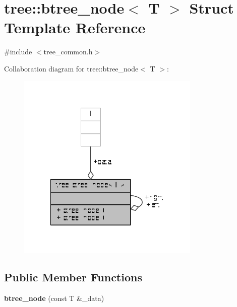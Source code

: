 \hypertarget{structtree_1_1btree__node}{\section{tree\-:\-:btree\-\_\-node$<$ T $>$ Struct Template Reference}
\label{structtree_1_1btree__node}
}


{\ttfamily \#include $<$tree\-\_\-common.\-h$>$}



Collaboration diagram for tree\-:\-:btree\-\_\-node$<$ T $>$\-:
\nopagebreak
\begin{figure}[H]
\begin{center}
\leavevmode
\includegraphics[width=247pt]{structtree_1_1btree__node__coll__graph}
\end{center}
\end{figure}
\subsection*{Public Member Functions}
\begin{DoxyCompactItemize}
\item 
\hypertarget{structtree_1_1btree__node_a6f97b71a8cb5cf273cf3a1635a1b8551}{{\bfseries btree\-\_\-node} (const T \&\-\_\-data)}\label{structtree_1_1btree__node_a6f97b71a8cb5cf273cf3a1635a1b8551}

\end{DoxyCompactItemize}
